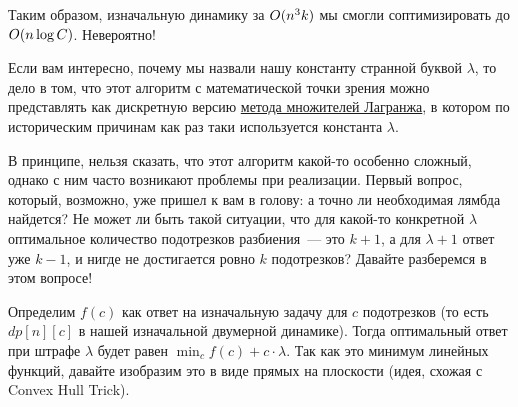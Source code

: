 Таким образом, изначальную динамику за $O(n^3 k)$ мы смогли соптимизировать до $O(n \log C)$. Невероятно!

\begin{observation}
    Если вам интересно, почему мы назвали нашу константу странной буквой $\lambda$, то дело в том, что этот алгоритм с математической точки зрения можно представлять как дискретную версию \href{https://ru.wikipedia.org/wiki/%D0%9C%D0%B5%D1%82%D0%BE%D0%B4_%D0%BC%D0%BD%D0%BE%D0%B6%D0%B8%D1%82%D0%B5%D0%BB%D0%B5%D0%B9_%D0%9B%D0%B0%D0%B3%D1%80%D0%B0%D0%BD%D0%B6%D0%B0}{метода множителей Лагранжа}, в котором по историческим причинам как раз таки используется константа $\lambda$.
\end{observation}

В принципе, нельзя сказать, что этот алгоритм какой-то особенно сложный, однако с ним часто возникают проблемы при реализации. Первый вопрос, который, возможно, уже пришел к вам в голову: а точно ли необходимая лямбда найдется? Не может ли быть такой ситуации, что для какой-то конкретной $\lambda$ оптимальное количество подотрезков разбиения~--- это $k + 1$, а для $\lambda + 1$ ответ уже $k - 1$, и нигде не достигается ровно $k$ подотрезков? Давайте разберемся в этом вопросе!

Определим $f(c)$ как ответ на изначальную задачу для $c$ подотрезков (то есть $dp[n][c]$ в нашей изначальной двумерной динамике). Тогда оптимальный ответ при штрафе $\lambda$ будет равен $\min_{c} f(c) + c \cdot \lambda$. Так как это минимум линейных функций, давайте изобразим это в виде прямых на плоскости (идея, схожая с Convex Hull Trick).

\begin{center}
\end{center}

